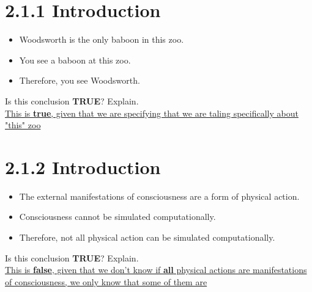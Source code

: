 \documentclass{article}
\begin{document}
\section*{2.1.1 Introduction}
\begin{itemize}
    \item Woodsworth is the only baboon in this zoo.
    \item You see a baboon at this zoo.
    \item Therefore, you see Woodsworth.
\end{itemize}
Is this conclusion \textbf{TRUE}? Explain.\\
\ul{This is \textbf{true}, given that we are specifying that we are taling specifically about "this" zoo}

\section*{2.1.2 Introduction}
\begin{itemize}
    \item The external manifestations of consciousness are a form of physical action.
    \item Consciousness cannot be simulated computationally.
    \item Therefore, not all physical action can be simulated computationally.
\end{itemize}
Is this conclusion \textbf{TRUE}? Explain.\\
\ul{This is \textbf{false}, given that we don't know if \textbf{all} physical actions are manifestations of consciousness, we only know that some of them are}
\end{document}
